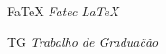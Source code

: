 \begin{siglas}
    \item[FaTeX] \emph{Fatec LaTeX}
    \item[TG] \emph{Trabalho de Gradua\~c\~ao}
\end{siglas}